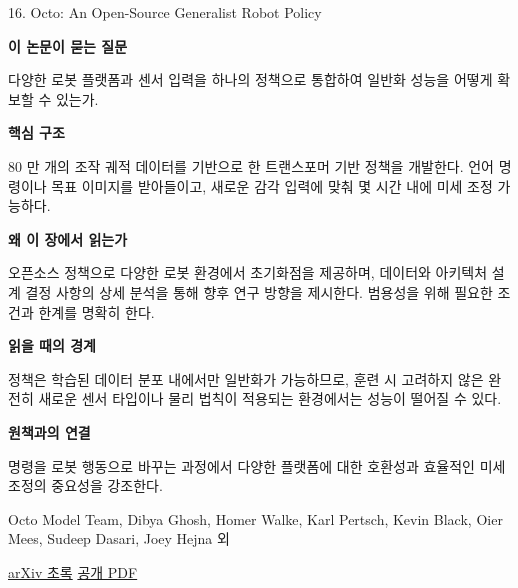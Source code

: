 \documentclass[11pt,openany]{book}
\begin{document}
\begin{termcard}{16. Octo: An Open-Source Generalist Robot Policy}

\par

\medskip

{\sffamily\bfseries\color{deepblue} 이 논문이 묻는 질문}\par

다양한 로봇 플랫폼과 센서 입력을 하나의 정책으로 통합하여 일반화 성능을 어떻게 확보할 수 있는가.

\smallskip

{\sffamily\bfseries\color{deepblue} 핵심 구조}\par

80 만 개의 조작 궤적 데이터를 기반으로 한 트랜스포머 기반 정책을 개발한다. 언어 명령이나 목표 이미지를 받아들이고, 새로운 감각 입력에 맞춰 몇 시간 내에 미세 조정 가능하다.

\smallskip

{\sffamily\bfseries\color{deepblue} 왜 이 장에서 읽는가}\par

오픈소스 정책으로 다양한 로봇 환경에서 초기화점을 제공하며, 데이터와 아키텍처 설계 결정 사항의 상세 분석을 통해 향후 연구 방향을 제시한다. 범용성을 위해 필요한 조건과 한계를 명확히 한다.

\smallskip

{\sffamily\bfseries\color{coral} 읽을 때의 경계}\par

정책은 학습된 데이터 분포 내에서만 일반화가 가능하므로, 훈련 시 고려하지 않은 완전히 새로운 센서 타입이나 물리 법칙이 적용되는 환경에서는 성능이 떨어질 수 있다.

\smallskip

{\sffamily\bfseries\color{teal} 원책과의 연결}\par

명령을 로봇 행동으로 바꾸는 과정에서 다양한 플랫폼에 대한 호환성과 효율적인 미세 조정의 중요성을 강조한다.

\medskip

{\footnotesize\color{muted} Octo Model Team, Dibya Ghosh, Homer Walke, Karl Pertsch, Kevin Black, Oier Mees, Sudeep Dasari, Joey Hejna 외\par

\href{https://arxiv.org/abs/2405.12213}{arXiv 초록} \quad \href{https://arxiv.org/pdf/2405.12213}{공개 PDF}\par}

\end{termcard}
\end{document}
